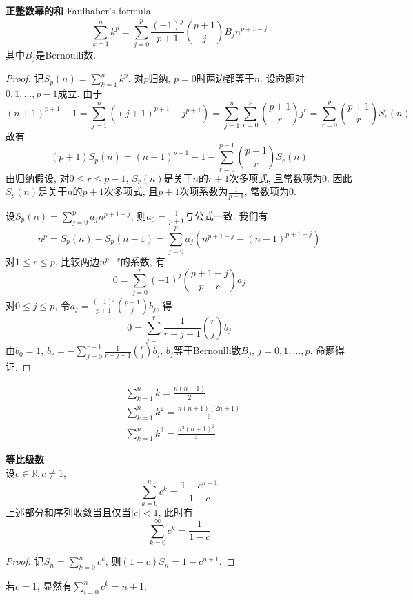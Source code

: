 \begin{pro}\textbf{正整数幂的和} Faulhaber's formula \\
\begin{equation}
    \sum_{k=1}^n k^p = \sum_{j=0}^p \frac{(-1)^j}{p+1} \binom{p+1}{j} B_j n^{p+1-j}
\end{equation}
其中$B_j$是Bernoulli数. 
\end{pro}
\begin{proof}
记$S_p(n)=\sum_{k=1}^n k^p$. 对$p$归纳, $p=0$时两边都等于$n$. 设命题对$0,1,\dots,p-1$成立. 由于
\begin{equation}
(n+1)^{p+1}-1=\sum_{j=1}^n ((j+1)^{p+1}-j^{p+1}) =\sum_{j=1}^n \sum_{r=0}^p \binom{p+1}{r} j^r =\sum_{r=0}^p \binom{p+1}{r} S_r(n)
\end{equation}
故有
\begin{equation}
    (p+1)S_p(n) = (n+1)^{p+1}-1-\sum_{r=0}^{p-1} \binom{p+1}{r} S_r(n)
\end{equation}
由归纳假设, 对$0\le r\le p-1$, $S_r(n)$是关于$n$的$r+1$次多项式, 且常数项为0. 因此$S_p(n)$是关于$n$的$p+1$次多项式, 且$p+1$次项系数为$\frac{1}{p+1}$, 常数项为0. 
\par 设$S_p(n)=\sum_{j=0}^p a_j n^{p+1-j}$, 则$a_0=\frac{1}{p+1}$与公式一致. 我们有
\begin{equation}
    n^p=S_p(n)-S_p(n-1)=\sum_{j=0}^p a_j (n^{p+1-j}-(n-1)^{p+1-j})
\end{equation}
对$1\le r\le p$, 比较两边$n^{p-r}$的系数, 有
\begin{equation}
    0=\sum_{j=0}^r (-1)^{j} \binom{p+1-j}{p-r} a_j 
\end{equation}
对$0\le j\le p$, 令$a_j=\frac{(-1)^j}{p+1}\binom{p+1}{j} b_j$, 得
\begin{equation}
0=\sum_{j=0}^r \frac{1}{r-j+1} \binom{r}{j} b_j
\end{equation}
由$b_0=1$, $b_r=-\sum_{j=0}^{r-1}\frac{1}{r-j+1}\binom{r}{j}b_j$, $b_j$等于Bernoulli数$B_j$, $j=0,1,\dots, p$. 命题得证.  
\end{proof}

\begin{col}
\begin{align}
&\sum_{k=1}^n k = \frac{n(n+1)}{2}\\
&\sum_{k=1}^n k^2 = \frac{n(n+1)(2n+1)}{6}\\
&\sum_{k=1}^n k^3 = \frac{n^2(n+1)^2}{4}
\end{align}
\end{col}

\begin{pro}\textbf{等比级数}\\
设$c\in \mathbb{R}, c\neq 1$, 
\begin{equation}
    \sum_{k=0}^n c^k=\frac{1-c^{n+1}}{1-c}
\end{equation}
上述部分和序列收敛当且仅当$|c|<1$, 此时有 
\begin{equation}
\sum_{k=0}^\infty c^k=\frac{1}{1-c}
\end{equation}
\end{pro}
\begin{proof}
记$S_n = \sum_{k=0}^n c^k$, 则$(1-c)S_n=1-c^{n+1}$. 
\end{proof}
若$c=1$, 显然有$\sum_{i=0}^n c^k=n+1$.


